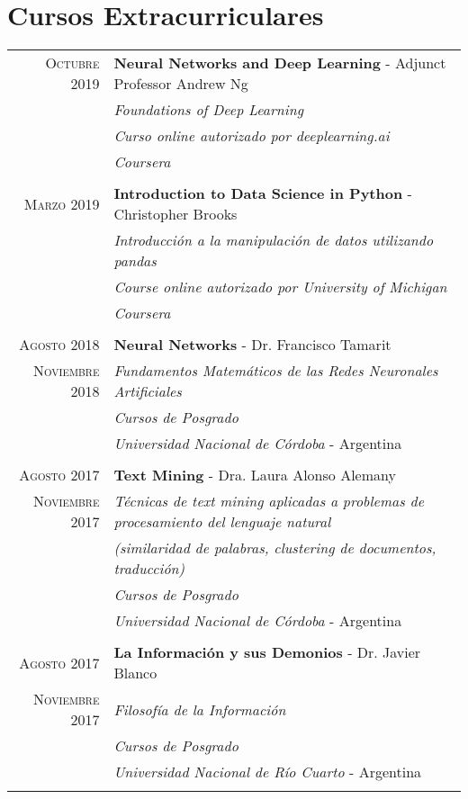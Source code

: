\documentclass[a4paper,10pt]{article} %
\begin{document}
\section{Cursos Extracurriculares}
\begin{longtable}{rl}
\textsc{Octubre} 2019 & \textbf{Neural Networks and Deep Learning} - Adjunct Professor Andrew Ng \\
& \textit{Foundations of Deep Learning}  \\
& \textit{Curso online autorizado por deeplearning.ai} \\
& \textit{Coursera} \\ & \\

\textsc{Marzo} 2019 & \textbf{Introduction to Data Science in Python} - Christopher Brooks \\
& \textit{Introducción a la manipulación de datos utilizando pandas}  \\
& \textit{Course online autorizado por University of Michigan} \\
& \textit{Coursera} \\ & \\

\textsc{Agosto} 2018 & \textbf{Neural Networks} - Dr. Francisco Tamarit \\
\textsc{Noviembre} 2018 & \textit{Fundamentos Matemáticos de las Redes Neuronales Artificiales}  \\ 
& \textit{Cursos de Posgrado} \\
& \textit{Universidad Nacional de Córdoba} - Argentina \\ & \\

\textsc{Agosto} 2017 & \textbf{Text Mining} - Dra. Laura Alonso Alemany \\
\textsc{Noviembre} 2017 & \textit{Técnicas de text mining aplicadas a problemas de procesamiento del lenguaje natural}  \\ 
& \textit{(similaridad de palabras, clustering de documentos, traducción)} \\
& \textit{Cursos de Posgrado} \\
& \textit{Universidad Nacional de Córdoba} - Argentina \\ & \\

\textsc{Agosto} 2017 & \textbf{La Información y sus Demonios} - Dr. Javier Blanco \\
\textsc{Noviembre} 2017 & \textit{Filosofía de la Información} \\
& \textit{Cursos de Posgrado} \\
& \textit{Universidad Nacional de Río Cuarto} - Argentina \\ & \\


\end{longtable}
\end{document}
